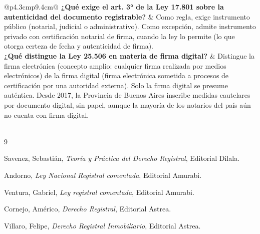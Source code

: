 \documentclass[12pt,oneside]{book}
\begin{document}
\begin{longtable}{@{}p{4.3cm}p{9.4cm}@{}}
\textbf{¿Qué exige el art. 3° de la Ley 17.801 sobre la autenticidad del documento registrable?} &
Como regla, exige instrumento público (notarial, judicial o administrativo). Como excepción, admite instrumento privado con certificación notarial de firma, cuando la ley lo permite (lo que otorga certeza de fecha y autenticidad de firma). \\[0.4em]

\textbf{¿Qué distingue la Ley 25.506 en materia de firma digital?} &
Distingue la firma electrónica (concepto amplio: cualquier firma realizada por medios electrónicos) de la firma digital (firma electrónica sometida a procesos de certificación por una autoridad externa). Solo la firma digital se presume auténtica. Desde 2017, la Provincia de Buenos Aires inscribe medidas cautelares por documento digital, sin papel, aunque la mayoría de los notarios del país aún no cuenta con firma digital. \\[0.4em]

\midrule
{} \\
\bottomrule
\end{longtable}


\begin{thebibliography}{9}

Savenez, Sebastián,
\textit{Teoría y Práctica del Derecho Registral},
Editorial Dilala.

Andorno,
\textit{Ley Nacional Registral comentada},
Editorial Amurabi.

Ventura, Gabriel,
\textit{Ley registral comentada},
Editorial Amurabi.

Cornejo, Américo,
\textit{Derecho Registral},
Editorial Astrea.

Villaro, Felipe,
\textit{Derecho Registral Inmobiliario},
Editorial Astrea.

\end{thebibliography}
\end{document}
